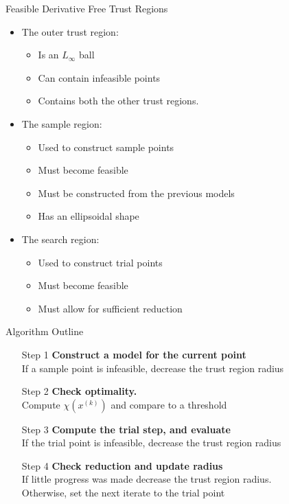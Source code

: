 \documentclass{beamer}
\newcommand{\xk}{{{x}^{(k)}}}
\begin{document}
\begin{frame}{Feasible Derivative Free Trust Regions}
	\begin{itemize}
		\item The outer trust region:
			\begin{itemize}
				\item Is an $L_{\infty}$ ball
				\item Can contain infeasible points
				\item Contains both the other trust regions.
			\end{itemize}
		\item The sample region:
			\begin{itemize}
				\item Used to construct sample points
				\item Must become feasible
				\item Must be constructed from the previous models
				\item Has an ellipsoidal shape
			\end{itemize}
		\item The search region:
			\begin{itemize}
				\item Used to construct trial points
				\item Must become feasible
				\item Must allow for sufficient reduction
			\end{itemize}
	\end{itemize}
\end{frame}


\begin{frame}{Algorithm Outline}
	\begin{itemize}
		\item[Step 1] \textbf{Construct a model for the current point} \\
			If a sample point is infeasible, decrease the trust region radius
		\item[Step 2] \textbf{Check optimality.} \\
			Compute $\chi\left(\xk\right)$ and compare to a threshold
		\item[Step 3] \textbf{Compute the trial step, and evaluate} \\
			If the trial point is infeasible, decrease the trust region radius
		\item[Step 4] \textbf{Check reduction and update radius} \\
			If little progress was made decrease the trust region radius. \\
			Otherwise, set the next iterate to the trial point
	\end{itemize}
\end{frame}
\end{document}
